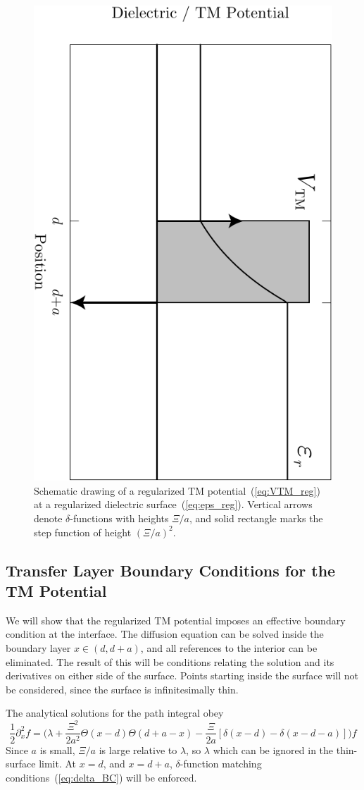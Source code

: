 \begin{figure}
  \centering
  \includegraphics[width=0.4\linewidth,angle=90]{fig/analytical/TMpot}
  \caption[Regularized TM Potential]{Schematic drawing of a regularized TM potential~(\ref{eq:VTM_reg})
    at a regularized dielectric surface~(\ref{eq:eps_reg}). 
    Vertical arrows denote $\delta$-functions with heights $\Xi/a$, and solid rectangle marks the 
    step function of height $(\Xi/a)^2$.  }
  \label{fig:TMpot}
\end{figure}


\subsection{Transfer Layer Boundary Conditions for the TM Potential}

We will show that the regularized TM potential imposes an effective boundary condition at the interface. 
The diffusion equation can be solved inside the boundary layer $x\in(d,d+a)$, and all references 
to the interior can be eliminated.  The result of this will be conditions relating
the solution and its derivatives on either side of the surface.
Points starting inside the surface will not be considered, since the surface is infinitesimally thin.

The analytical solutions for the path integral obey
\begin{equation}
  \frac{1}{2}\partial_x^2f =\bigg(\lambda+\frac{\Xi^2}{2a^2}\Theta(x-d)\Theta(d+a-x)
  - \frac{\Xi}{2a}[\delta(x-d)-\delta(x-d-a)]\bigg)f
\end{equation}
Since $a$ is small, $\Xi/a$ is large relative to $\lambda$, so $\lambda$ which can be ignored in the thin-surface limit.    
At $x=d$, and $x=d+a$, $\delta$-function matching conditions~(\ref{eq:delta_BC}) will be enforced.

